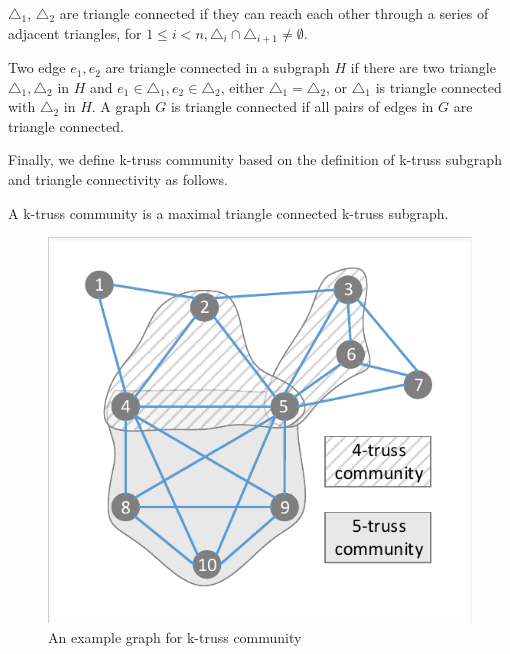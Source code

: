 \begin{Def} 
${\triangle}_{1}$, ${\triangle}_{2}$ are triangle connected if they can reach each other through a series of adjacent triangles, \ie for $1 \le i < n, {\triangle}_{i} \cap {\triangle}_{i+1} \neq \emptyset$. 
\label{def:triangle_connectivity}
\end{Def}

\begin{Def}
Two edge $e_{1}, e_{2}$ are triangle connected in a subgraph $H$ if there are two triangle ${\triangle}_{1}, {\triangle}_{2}$ in $H$ and $e_{1} \in {\triangle}_{1}, e_{2} \in {\triangle}_{2}$, either ${\triangle}_{1} = {\triangle}_{2}$, or ${\triangle}_{1}$ is triangle connected with ${\triangle}_{2}$ in $H$.
A graph $G$ is triangle connected if all pairs of edges in $G$ are triangle connected.
\label{def:triangle_connected_graph}
\end{Def}

Finally, we define k-truss community based on the definition of k-truss subgraph and triangle connectivity as follows.

\begin{Def} 
A k-truss community is a maximal triangle connected k-truss subgraph.
\label{def:k-truss_community}
\end{Def}

\begin{figure}[ht]
    \centering
    \includegraphics[width=\linewidth]{./figures/k-truss.pdf}
    \caption{An example graph for k-truss community}
    \label{fig:example}
\end{figure}

